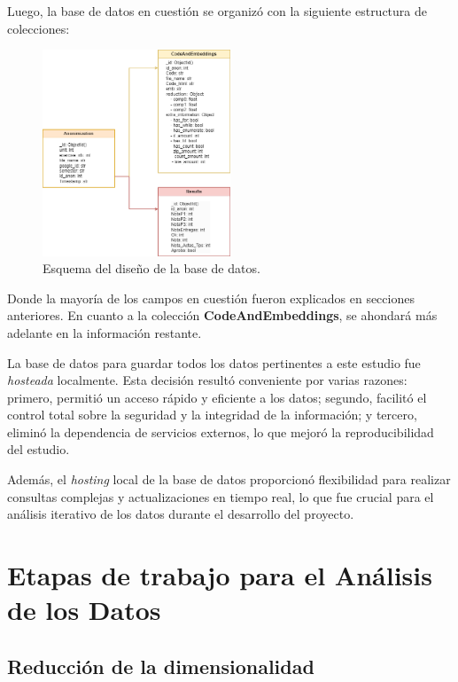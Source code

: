 \documentclass[11pt,a4paper,twoside,openany]{tesis}
\begin{document}
Luego, la base de datos en cuestión se organizó con la siguiente estructura de colecciones:

\begin{figure}[H]
    \centering
    \includegraphics[width=0.5\textwidth]{imagenes/diagrama-base.png}
    \caption{Esquema del diseño de la base de datos.}
    \label{diagrama-base}
\end{figure}

Donde la mayoría de los campos en cuestión fueron explicados en secciones anteriores. En cuanto a la colección \textbf{CodeAndEmbeddings}, se ahondará más adelante en la información restante.

La base de datos para guardar todos los datos pertinentes a este estudio fue \emph{hosteada} localmente. Esta decisión resultó conveniente por varias razones: primero, permitió un acceso rápido y eficiente a los datos; segundo, facilitó el control total sobre la seguridad y la integridad de la información; y tercero, eliminó la dependencia de servicios externos, lo que mejoró la reproducibilidad del estudio.

Además, el \emph{hosting} local de la base de datos proporcionó flexibilidad para realizar consultas complejas y actualizaciones en tiempo real, lo que fue crucial para el análisis iterativo de los datos durante el desarrollo del proyecto.

\section{Etapas de trabajo para el Análisis de los Datos}

\subsection{Reducción de la dimensionalidad}
\end{document}
